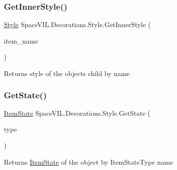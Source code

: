 \subsubsection{\texorpdfstring{Get\+Inner\+Style()}{GetInnerStyle()}}
{\footnotesize\ttfamily \mbox{\hyperlink{class_space_v_i_l_1_1_decorations_1_1_style}{Style}} Space\+V\+I\+L.\+Decorations.\+Style.\+Get\+Inner\+Style (\begin{DoxyParamCaption}\item[{String}]{item\+\_\+name }\end{DoxyParamCaption})\hspace{0.3cm}{\ttfamily [inline]}}



Returns style of the object\textquotesingle{}s child by name 

\mbox{\label{class_space_v_i_l_1_1_decorations_1_1_style_a05cf6e203731473665ab67f8d784a2b0}} 
\subsubsection{\texorpdfstring{Get\+State()}{GetState()}}
{\footnotesize\ttfamily \mbox{\hyperlink{class_space_v_i_l_1_1_decorations_1_1_item_state}{Item\+State}} Space\+V\+I\+L.\+Decorations.\+Style.\+Get\+State (\begin{DoxyParamCaption}\item[{Item\+State\+Type}]{type }\end{DoxyParamCaption})\hspace{0.3cm}{\ttfamily [inline]}}



Returns \mbox{\hyperlink{class_space_v_i_l_1_1_decorations_1_1_item_state}{Item\+State}} of the object by Item\+State\+Type name 

\mbox{\label{class_space_v_i_l_1_1_decorations_1_1_style_a43cea968e01ca67de57f6f5056377dab}} 

